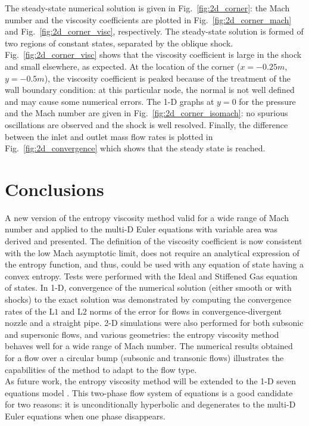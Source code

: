 \documentclass[preprint,10pt]{elsarticle}
\newcommand{\fig}[1]{Fig.~\ref{#1}}                      %
\begin{document}
%
The steady-state numerical solution is given in \fig{fig:2d_corner}: the Mach number and the viscosity coefficients are plotted in \fig{fig:2d_corner_mach} and \fig{fig:2d_corner_visc}, respectively. The steady-state solution is formed of two regions of constant states, separated by the oblique shock. \fig{fig:2d_corner_visc} shows that the viscosity coefficient is large in the shock and small elsewhere, as expected. At the location of the corner ($x=-0.25m$, $y=-0.5m$), the viscosity coefficient is peaked because of the treatment of the wall boundary condition: at this particular node, the normal is not well defined and may cause some numerical errors. The 1-D graphs at $y=0$ for the pressure and the Mach number are given in \fig{fig:2d_corner_isomach}: no spurious oscillations are observed and the shock is well resolved. Finally, the difference between the inlet and outlet mass flow rates is plotted in \fig{fig:2d_convergence} which shows that the steady state is reached. 

\section{Conclusions} \label{sec:ccl}

A new version of the entropy viscosity method valid for a wide range of Mach number and applied to the multi-D Euler equations with variable area was derived and presented. The definition of the viscosity coefficient is now consistent with the low Mach asymptotic limit, does not require an analytical expression of the entropy function, and thus, could be used with any equation of state having a convex entropy. Tests were performed with the Ideal and Stiffened Gas equation of states. In 1-D, convergence of the numerical solution (either smooth or with shocks) to the exact solution was demonstrated by computing the convergence rates of the L$1$ and L$2$ norms of the error for flows in convergence-divergent nozzle and a straight pipe. 2-D simulations were also performed for both subsonic and supersonic flows, and various geometries: the entropy viscosity method behaves well for a wide range of Mach number. The numerical results obtained for a flow over a circular bump (subsonic and transonic flows) illustrates the capabilities of the method to adapt to the flow type. \\
As future work, the entropy viscosity method will be extended to the 1-D seven equations model \cite{SEM}. This two-phase flow system of equations is a good candidate for two reasons: it is unconditionally hyperbolic and degenerates to the multi-D Euler equations when one phase disappears.
\end{document}
